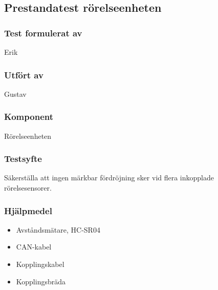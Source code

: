 \clearpage
\subsection{Prestandatest rörelseenheten}
\label{test:MotionPrestanda}

\setlength{\columnsep}{1cm}




\begin{multicols}{2}
\subsubsection*{Test formulerat av}
Erik

\subsubsection*{Utfört av}
Gustav


\end{multicols}
\subsubsection*{Komponent}
Rörelseenheten


\subsubsection*{Testsyfte}
Säkerställa att ingen märkbar fördröjning sker vid flera inkopplade rörelsesensorer.

\subsubsection*{Hjälpmedel}
\begin{itemize}
	\item Avståndsmätare, HC-SR04
	\item CAN-kabel
	\item Kopplingskabel
	\item Kopplingsbräda
\end{itemize}



